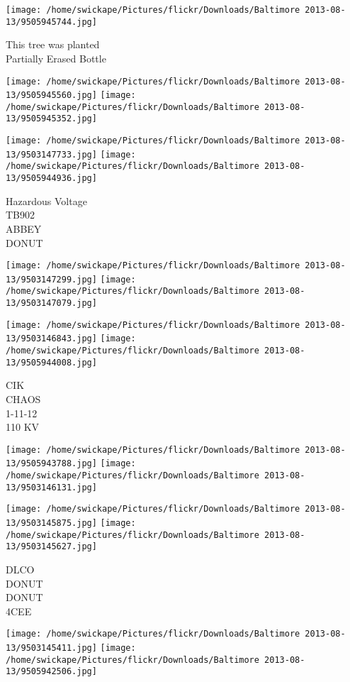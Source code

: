 \documentclass[10pt,letterpaper]{article}
\begin{document}
\vspace{0.25in}
\texttt{[image: /home/swickape/Pictures/flickr/Downloads/Baltimore 2013-08-13/9505945744.jpg]}

This tree was planted\\
Partially Erased Bottle
\pagebreak

\texttt{[image: /home/swickape/Pictures/flickr/Downloads/Baltimore 2013-08-13/9505945560.jpg]}
\texttt{[image: /home/swickape/Pictures/flickr/Downloads/Baltimore 2013-08-13/9505945352.jpg]}

\texttt{[image: /home/swickape/Pictures/flickr/Downloads/Baltimore 2013-08-13/9503147733.jpg]}
\texttt{[image: /home/swickape/Pictures/flickr/Downloads/Baltimore 2013-08-13/9505944936.jpg]}

Hazardous Voltage\\
TB902\\
ABBEY\\
DONUT
\pagebreak

\texttt{[image: /home/swickape/Pictures/flickr/Downloads/Baltimore 2013-08-13/9503147299.jpg]}
\texttt{[image: /home/swickape/Pictures/flickr/Downloads/Baltimore 2013-08-13/9503147079.jpg]}

\texttt{[image: /home/swickape/Pictures/flickr/Downloads/Baltimore 2013-08-13/9503146843.jpg]}
\texttt{[image: /home/swickape/Pictures/flickr/Downloads/Baltimore 2013-08-13/9505944008.jpg]}

CIK\\
CHAOS\\
1{-}11{-}12\\
110 KV
\pagebreak

\texttt{[image: /home/swickape/Pictures/flickr/Downloads/Baltimore 2013-08-13/9505943788.jpg]}
\texttt{[image: /home/swickape/Pictures/flickr/Downloads/Baltimore 2013-08-13/9503146131.jpg]}

\texttt{[image: /home/swickape/Pictures/flickr/Downloads/Baltimore 2013-08-13/9503145875.jpg]}
\texttt{[image: /home/swickape/Pictures/flickr/Downloads/Baltimore 2013-08-13/9503145627.jpg]}

DLCO\\
DONUT\\
DONUT\\
4CEE
\pagebreak

\texttt{[image: /home/swickape/Pictures/flickr/Downloads/Baltimore 2013-08-13/9503145411.jpg]}
\texttt{[image: /home/swickape/Pictures/flickr/Downloads/Baltimore 2013-08-13/9505942506.jpg]}
\end{document}
